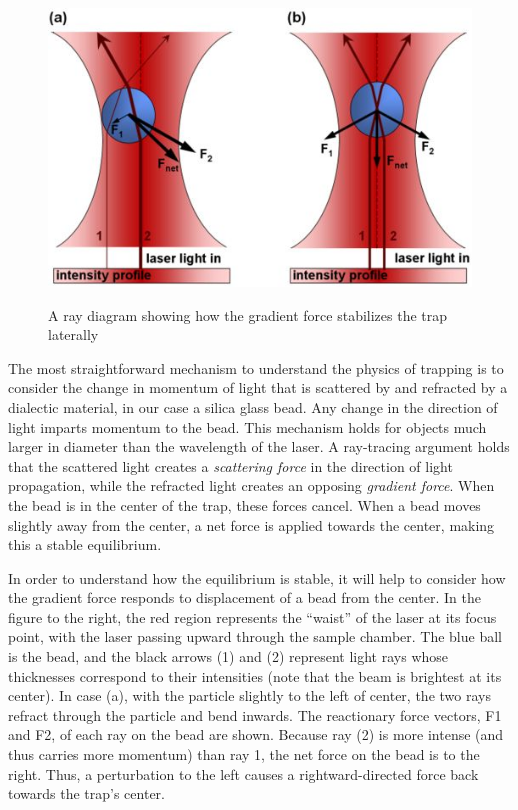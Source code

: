 \documentclass{../lab}
\begin{document}
\begin{figure}[h]
    \centering
    \href{http://experimentationlab.berkeley.edu/sites/default/files/images/500px-Optical_Trap_Ray_Optics_Explanation.jpg}{\includegraphics[width=0.5\linewidth]{images/500px-Optical_Trap_Ray_Optics_Explanation.jpg}}
    \caption{A ray diagram showing how the gradient force stabilizes the trap laterally}
    \label{fig:500px-Optical_Trap_Ray_Optics_Explanation}
\end{figure}

The most straightforward mechanism to understand the physics of trapping is to consider the change in momentum of light that is scattered by and refracted by a dialectic material, in our case a silica glass bead. Any change in the direction of light imparts momentum to the bead. This mechanism holds for objects much larger in diameter than the wavelength of the laser. A ray-tracing argument holds that the scattered light creates a \emph{scattering force} in the direction of light propagation, while the refracted light creates an opposing \emph{gradient force}. When the bead is in the center of the trap, these forces cancel. When a bead moves slightly away from the center, a net force is applied towards the center, making this a stable equilibrium.

\newpage

In order to understand how the equilibrium is stable, it will help to consider how the gradient force responds to displacement of a bead from the center. In the figure to the right, the red region represents the ``waist'' of the laser at its focus point, with the laser passing upward through the sample chamber. The blue ball is the bead, and the black arrows (1) and (2) represent light rays whose thicknesses correspond to their intensities (note that the beam is brightest at its center). In case (a), with the particle slightly to the left of center, the two rays refract through the particle and bend inwards. The reactionary force vectors, F1 and F2, of each ray on the bead are shown. Because ray (2) is more intense (and thus carries more momentum) than ray 1, the net force on the bead is to the right. Thus, a perturbation to the left causes a rightward-directed force back towards the trap's center.
\end{document}
